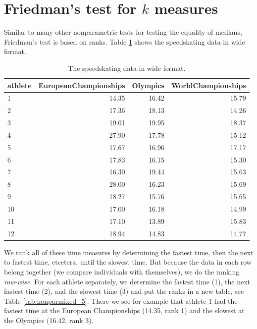 \documentclass[]{book}\usepackage[]{graphicx}\usepackage[]{color}
\begin{document}
\section{Friedman's test for $k$ measures}


Similar to many other nonparametric tests for testing the equality of medians, Friedman's test is based on ranks. Table \ref{tab:nonparmixed_4} shows the speedskating data in wide format.


\begin{table}[ht]
\centering
\caption{The speedskating data in wide format.} 
\label{tab:nonparmixed_4}
\begin{tabular}{lrrr}
  \hline
athlete & EuropeanChampionships & Olympics & WorldChampionships \\ 
  \hline
1 & 14.35 & 16.42 & 15.79 \\ 
  2 & 17.36 & 18.13 & 14.26 \\ 
  3 & 19.01 & 19.95 & 18.37 \\ 
  4 & 27.90 & 17.78 & 15.12 \\ 
  5 & 17.67 & 16.96 & 17.17 \\ 
  6 & 17.83 & 16.15 & 15.30 \\ 
  7 & 16.30 & 19.44 & 15.63 \\ 
  8 & 28.00 & 16.23 & 15.69 \\ 
  9 & 18.27 & 15.76 & 15.65 \\ 
  10 & 17.00 & 16.18 & 14.99 \\ 
  11 & 17.10 & 13.89 & 15.83 \\ 
  12 & 18.94 & 14.83 & 14.77 \\ 
   \hline
\end{tabular}
\end{table}


We rank all of these time measures by determining the fastest time, then the next to fastest time, etcetera, until the slowest time. But because the data in each row belong together (we compare individuals with themselves), we do the ranking \textit{row-wise}. For each athlete separately, we determine the fastest time (1), the next fastest time (2), and the slowest time (3) and put the ranks in a new table, see Table \ref{tab:nonparmixed_5}. There we see for example that athlete 1 had the fastest time at the European Championships (14.35, rank 1) and the slowest at the Olympics (16.42, rank 3).
\end{document}
